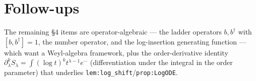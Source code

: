 \documentclass[11pt]{article}
\begin{document}
\section{Follow-ups}
The remaining \S4 items are operator-algebraic --- the ladder operators $b,b^\dagger$ with
$[b,b^\dagger]=1$, the number operator, and the log-insertion generating function --- which want a
Weyl-algebra framework, plus the order-derivative identity
$\partial_\lambda^k S_\lambda=\int(\log t)^k t^{\lambda-1}e^{\cdots}$ (differentiation under the
integral in the order parameter) that underlies \texttt{lem:log\_shift}/\texttt{prop:LogODE}.
\end{document}
